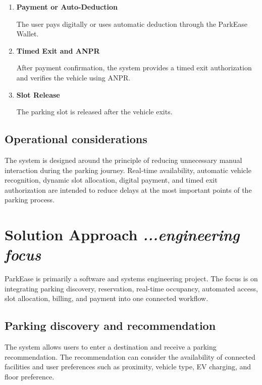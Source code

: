 \documentclass[12pt,a4paper]{article}
\begin{document}
\begin{enumerate}
    The system calculates the parking charge based on the actual parking duration.

    \item \textbf{Payment or Auto-Deduction}
    
    The user pays digitally or uses automatic deduction through the ParkEase Wallet.

    \item \textbf{Timed Exit and ANPR}
    
    After payment confirmation, the system provides a timed exit authorization and verifies the vehicle using ANPR.

    \item \textbf{Slot Release}
    
    The parking slot is released after the vehicle exits.
\end{enumerate}

\subsection{Operational considerations}

The system is designed around the principle of reducing unnecessary manual interaction during the parking journey. Real-time availability, automatic vehicle recognition, dynamic slot allocation, digital payment, and timed exit authorization are intended to reduce delays at the most important points of the parking process.


\section{\textbf{Solution Approach}
\hfill
{\small\mdseries\itshape ...engineering focus}}

ParkEase is primarily a software and systems engineering project. The focus is on integrating parking discovery, reservation, real-time occupancy, automated access, slot allocation, billing, and payment into one connected workflow.

\subsection{Parking discovery and recommendation}

The system allows users to enter a destination and receive a parking recommendation. The recommendation can consider the availability of connected facilities and user preferences such as proximity, vehicle type, EV charging, and floor preference.
\end{document}
